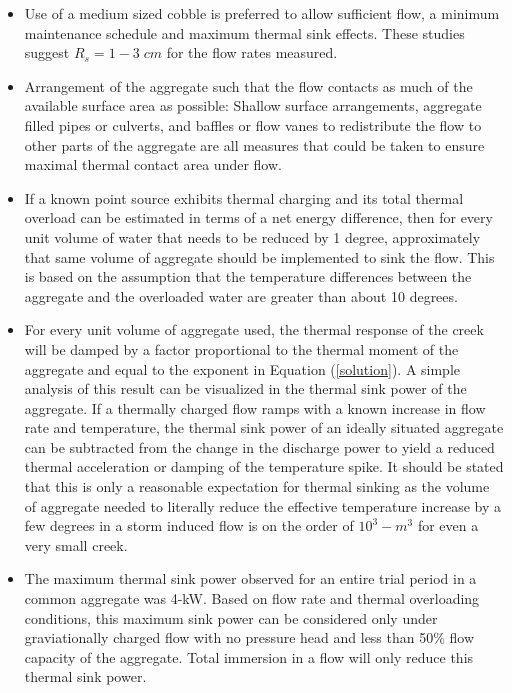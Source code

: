 \begin{itemize}
 \item Use of a medium sized cobble is preferred to allow sufficient flow, a minimum maintenance schedule and maximum thermal sink effects. These studies suggest $R_s=1-3\;cm$ for the flow rates measured.
 \item Arrangement of the aggregate such that the flow contacts as much of the available surface area as possible: Shallow surface arrangements, aggregate filled pipes or culverts, and baffles or flow vanes to redistribute the flow to other parts of the aggregate are all measures that could be taken to ensure maximal thermal contact area under flow.
 \item If a known point source exhibits thermal charging and its total thermal overload can be estimated in terms of a net energy difference, then for every unit volume of water that needs to be reduced by 1 degree, approximately that same volume of aggregate should be implemented to sink the flow. This is based on the assumption that the temperature differences between the aggregate and the overloaded water are greater than about 10 degrees. 
 \item For every unit volume of aggregate used, the thermal response of the creek will be damped by a factor proportional to the thermal moment of the aggregate and equal to the exponent in Equation (\ref{solution}). A simple analysis of this result can be visualized in the thermal sink power of the aggregate. If a thermally charged flow ramps with a known increase in flow rate and temperature, the thermal sink power of an ideally situated aggregate can be subtracted from the change in the discharge power to yield a reduced thermal acceleration or damping of the temperature spike. It should be stated that this is only a reasonable expectation for thermal sinking as the volume of aggregate needed to literally reduce the effective temperature increase by a few degrees in a storm induced flow is on the order of $10^{3}-m^{3}$ for even a very small creek.
 \item The maximum thermal sink power observed for an entire trial period in a common aggregate was 4-kW. Based on flow rate and thermal overloading conditions, this maximum sink power can be considered only under graviationally charged flow with no pressure head and less than 50\% flow capacity of the aggregate. Total immersion in a flow will only reduce this thermal sink power. 
\end{itemize}

